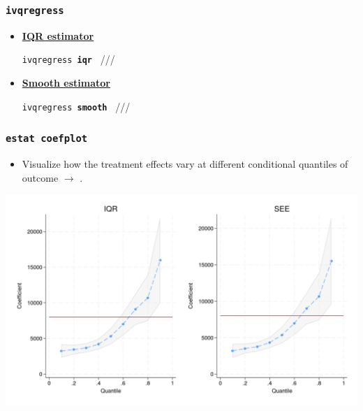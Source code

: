 \documentclass[11pt]{beamer}
\begin{document}
\begin{frame}
  \frametitle{{\tt ivqregress}}

\begin{itemize}
  \item \hyperlink{ivqreg_output.pdf.1}{\bf IQR estimator}

    \vskip 0.2cm
  {\footnotesize \tt ivqregress {\bf iqr} } \hskip 0.5cm ///

  \hskip 2cm {\footnotesize \tt {}} 

   \vskip 0.5cm
 \item \hyperlink{ivqreg_output.pdf.5}{\bf Smooth estimator}

    \vskip 0.2cm
  {\footnotesize \tt ivqregress {\bf smooth} } \hskip 0.1cm ///

  \hskip 2cm {\footnotesize \tt {}} 
\end{itemize}
\end{frame}

\begin{frame}
  \frametitle{{\tt estat coefplot}}

  \begin{itemize}
    \item Visualize how the treatment effects vary at different conditional
      quantiles of outcome $\rightarrow$ .
  \end{itemize}

  \begin{center} 
\includegraphics[scale=0.17]{eps/coefplot2}
\end{center}
\end{frame}
\end{document}
